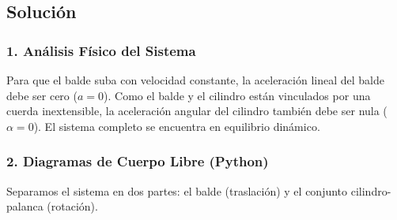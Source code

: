 \documentclass[12pt, a4paper]{article}
\begin{document}
\begin{center}
\end{center}

\subsection*{Solución}

\subsubsection*{1. Análisis Físico del Sistema}
Para que el balde suba con velocidad constante, la aceleración lineal del balde debe ser cero ($a = 0$). Como el balde y el cilindro están vinculados por una cuerda inextensible, la aceleración angular del cilindro también debe ser nula ($\alpha = 0$). El sistema completo se encuentra en equilibrio dinámico.

\subsubsection*{2. Diagramas de Cuerpo Libre (Python)}
Separamos el sistema en dos partes: el balde (traslación) y el conjunto cilindro-palanca (rotación).
\end{document}
